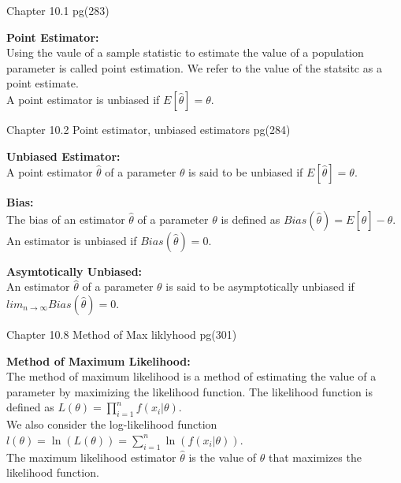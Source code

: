 \documentclass[answers,12pt,addpoints]{exam}
\begin{document}
Chapter 10.1 pg(283)\\
\begin{definition}
    \textbf{Point Estimator:}\\
    Using the vaule of a sample statistic to estimate the value of a population parameter is called point estimation. We refer to the value of the statsitc as a point estimate.\\
    A point estimator is unbiased if $E[\hat{\theta}] = \theta$.
\end{definition}
Chapter 10.2 Point estimator, unbiased estimators pg(284)\\
\begin{definition}
    \textbf{Unbiased Estimator:}\\
    A point estimator $\hat{\theta}$ of a parameter $\theta$ is said to be unbiased if $E[\hat{\theta}] = \theta$.
\end{definition}
\begin{definition}
    \textbf{Bias:}\\
    The bias of an estimator $\hat{\theta}$ of a parameter $\theta$ is defined as $Bias(\hat{\theta}) = E[\hat{\theta}] - \theta$. An estimator is unbiased if $Bias(\hat{\theta}) = 0$.
\end{definition}
\begin{definition}
    \textbf{Asymtotically Unbiased:}\\
    An estimator $\hat{\theta}$ of a parameter $\theta$ is said to be asymptotically unbiased if $lim_{n \to \infty} Bias(\hat{\theta}) = 0$.
\end{definition}
Chapter 10.8 Method of Max liklyhood pg(301)\\
\begin{definition}
    \textbf{Method of Maximum Likelihood:}\\
    The method of maximum likelihood is a method of estimating the value of a parameter by maximizing the likelihood function. The likelihood function is defined as $L(\theta) = \prod_{i=1}^{n}f(x_i|\theta)$.\\
    We also consider the log-likelihood function $l(\theta) = \ln(L(\theta)) = \sum_{i=1}^{n}\ln(f(x_i|\theta))$.\\
    The maximum likelihood estimator $\hat{\theta}$ is the value of $\theta$ that maximizes the likelihood function.\\
\end{definition}
\end{document}
